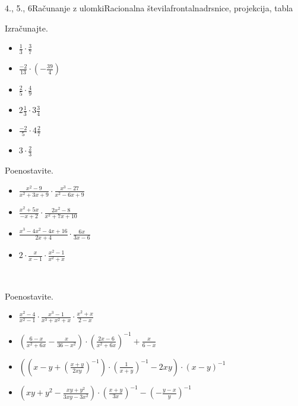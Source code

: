 \begin{priprava}{4., 5., 6}{}{Računanje z ulomki}{Racionalna števila}{frontalna}{drsnice, projekcija, tabla}
\begin{multicols}{2}
    \begin{naloga}
        Izračunajte.
        \begin{itemize}
                    \item $\frac{1}{3}\cdot \frac{3}{7}$ 
                    \item $\frac{-2}{13}\cdot \left(-\frac{39}{4}\right)$ 
                    \item $\frac{2}{5}\cdot \frac{4}{9}$ 
                    \item $2\frac{1}{3}\cdot 3\frac{3}{4}$ 
                    \item $\frac{-2}{5}\cdot 4\frac{2}{7}$ 
                    \item $3\cdot\frac{2}{3}$ 
        \end{itemize}
    \end{naloga}




    \begin{naloga}
        Poenostavite.
        \begin{itemize}
            \item $\frac{x^2-9}{x^2+3x+9}\cdot\frac{x^3-27}{x^2-6x+9}$ 
            \item $\frac{x^2+5x}{-x+2}\cdot\frac{2x^2-8}{x^2+7x+10}$ 
            \item $\frac{x^3-4x^2-4x+16}{2x+4}\cdot\frac{6x}{3x-6}$ 
            \item $2\cdot\frac{x}{x-1}\cdot\frac{x^2-1}{x^2+x}$ 
        \end{itemize}
    \end{naloga}
~

\end{multicols}

    \begin{naloga}
        Poenostavite.
        \begin{itemize}
            \item $\frac{x^2-4}{x^2-1}\cdot\frac{x^3-1}{x^3+x^2+x}\cdot\frac{x^2+x}{2-x}$ 
            \item $\left(\frac{6-x}{x^2+6x}-\frac{x}{36-x^2}\right)\cdot\left(\frac{2x-6}{x^2+6x}\right)^{-1}+\frac{x}{6-x}$ 
            \item $\left(\left(x-y+\left(\frac{x+y}{2xy}\right)^{-1}\right)\cdot\left(\frac{1}{x+y}\right)^{-1}-2xy\right)\cdot(x-y)^{-1}$ 
            \item $\left(xy+y^2-\frac{xy+y^2}{3xy-3x^2}\right)\cdot\left(\frac{x+y}{3x}\right)^{-1}-\left(-\frac{y-x}{y}\right)^{-1}$ 
        \end{itemize}
    \end{naloga}



\end{priprava}
